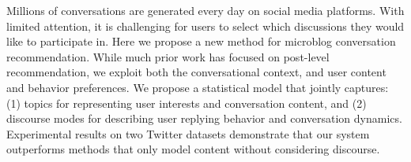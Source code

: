 Millions of conversations are generated every day on social media platforms. With limited attention, it is challenging for users to select which discussions they would like to participate in. Here we propose a new method for microblog conversation recommendation. While much prior work has focused on post-level recommendation, we exploit both the conversational context, and user content and behavior preferences. We propose a statistical model that jointly captures: (1) topics for representing user interests and conversation content, and (2) discourse modes for describing user replying behavior and conversation dynamics. Experimental results on two Twitter datasets demonstrate that our system outperforms methods that only model content without considering discourse.
